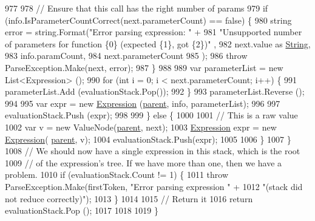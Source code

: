 \begin{DoxyCode}
977 
978                         \textcolor{comment}{// Ensure that this call has the right number of params}
979                         \textcolor{keywordflow}{if} (info.IsParameterCountCorrect(next.parameterCount) == \textcolor{keyword}{false}) \{
980                             \textcolor{keywordtype}{string} error = string.Format(\textcolor{stringliteral}{"Error parsing expression: "} +
981                                 \textcolor{stringliteral}{"Unsupported number of parameters for function \{0\} (expected \{1\}, got \{2\})"}
      ,
982                                 next.value as \hyperlink{a00040_a301aa7c866593a5b625a8fc158bbeacea27118326006d3829667a400ad23d5d98}{String},
983                                 info.paramCount,
984                                 next.parameterCount
985                             );
986                             \textcolor{keywordflow}{throw} ParseException.Make(next, error);
987                         \}
988 
989                         var parameterList = \textcolor{keyword}{new} List<Expression> ();
990                         \textcolor{keywordflow}{for} (\textcolor{keywordtype}{int} i = 0; i < next.parameterCount; i++) \{
991                             parameterList.Add (evaluationStack.Pop());
992                         \}
993                         parameterList.Reverse ();
994 
995                         var expr = \textcolor{keyword}{new} \hyperlink{a00054_a91f0536300ebb39eaf9b7526c7e97364}{Expression} (\hyperlink{a00077_af313a82103fcc2ff5a177dbb06b92f7b}{parent}, info, parameterList);
996 
997                         evaluationStack.Push (expr);
998 
999                     \} \textcolor{keywordflow}{else} \{
1000 
1001                         \textcolor{comment}{// This is a raw value}
1002                         var v = \textcolor{keyword}{new} ValueNode(\hyperlink{a00077_af313a82103fcc2ff5a177dbb06b92f7b}{parent}, next);
1003                         \hyperlink{a00054_a91f0536300ebb39eaf9b7526c7e97364}{Expression} expr = \textcolor{keyword}{new} \hyperlink{a00054_a91f0536300ebb39eaf9b7526c7e97364}{Expression}(
      \hyperlink{a00077_af313a82103fcc2ff5a177dbb06b92f7b}{parent}, v);
1004                         evaluationStack.Push(expr);
1005 
1006                     \}
1007                 \}
1008                 \textcolor{comment}{// We should now have a single expression in this stack, which is the root}
1009                 \textcolor{comment}{// of the expression's tree. If we have more than one, then we have a problem.}
1010                 \textcolor{keywordflow}{if} (evaluationStack.Count != 1) \{
1011                     \textcolor{keywordflow}{throw} ParseException.Make(firstToken, \textcolor{stringliteral}{"Error parsing expression "} +
1012                         \textcolor{stringliteral}{"(stack did not reduce correctly)"});
1013                 \}
1014 
1015                 \textcolor{comment}{// Return it}
1016                 \textcolor{keywordflow}{return} evaluationStack.Pop ();
1017 
1018 
1019             \}
\end{DoxyCode}
